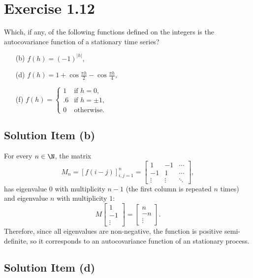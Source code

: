 \section*{Exercise 1.12}

Which, if any, of the following functions defined on the integers is the autocovariance function of a stationary time series?

\begin{enumerate}
    \item[(b)] $f(h) = (-1)^{|h|},$
    \item[(d)] $f(h) = 1 + \cos \frac{\pi h}{2} - \cos \frac{\pi h}{4},$
    \item[(f)] $f(h) = \begin{cases}
        1 & \mbox{if } h = 0,\\
        .6 & \mbox{if } h = \pm 1,\\
        0 & \mbox{otherwise}.
    \end{cases} $
\end{enumerate}

\subsection*{Solution Item (b)}

For every $n\in \N$, the matrix
\[ M_n = [f(i-j)]_{i,j = 1}^n = \left[ \begin{matrix}
    1 & -1 & \cdots\\
    -1 & 1 & \cdots\\
    \vdots & \vdots & \ddots
\end{matrix} \right], \] 
has eigenvalue $0$ with multiplicity $n-1$ (the first column is repeated $n$ times) and eigenvalue $n$ with multiplicity $1$:
\[ M \left[ \begin{matrix}
    1\\-1\\\vdots
\end{matrix} \right] = \left[ \begin{matrix}
    n\\-n\\\vdots
\end{matrix} \right] .\]
Therefore, since all eigenvalues are non-negative, the function is positive semi-definite, so it corresponds to an autocovariance function of an stationary process.

\subsection*{Solution Item (d)}

